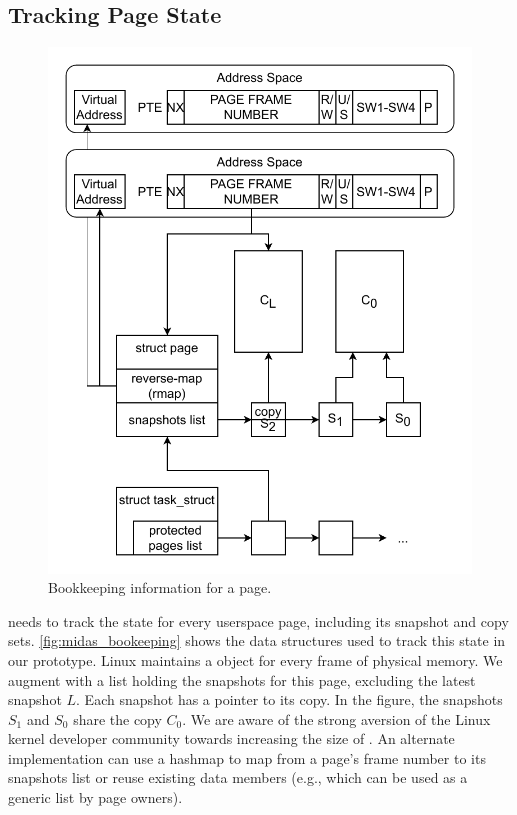 \documentclass[letterpaper,twocolumn,10pt]{article}
\begin{document}
\subsection{Tracking Page State}

\begin{figure}[]
  \centering
  \includegraphics[width=\linewidth]{img/book-keeping.pdf}
  \caption{Bookkeeping information for a page.}
  \label{fig:midas_bookeeping}
\end{figure}

\midas needs to track the state for every userspace page, including
its snapshot and copy sets.
\autoref{fig:midas_bookeeping} shows the data structures used to
track this state in our prototype.
Linux maintains a  object for every frame of
physical memory.
We augment   with a list holding the snapshots
for this page, excluding the latest snapshot $L$.
Each snapshot has a pointer to its copy.
In the figure, the snapshots $S_1$ and $S_0$ share the copy $C_0$.
We are aware of the strong aversion of the
Linux kernel developer community towards increasing the size of
.
An alternate implementation can use a hashmap to
map from a page's frame number to its snapshots list or
reuse existing data members (e.g.,  which
can be used as a generic list by page owners).
\end{document}
